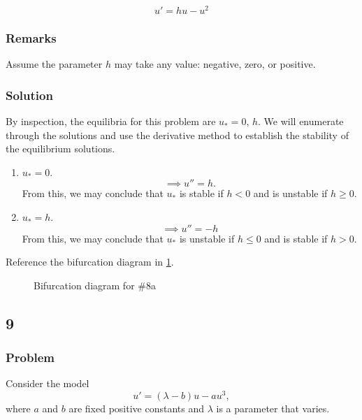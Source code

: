 \documentclass[12pt]{article}
\begin{document}
\begin{equation}
  \label{eq:8a-problem}
  u'=hu-u^2
\end{equation}

\subsubsection*{Remarks}
Assume the parameter $h$ may take any value: negative, zero, or positive.

\subsubsection*{Solution}
By inspection, the equilibria for this problem are $u_*=0,\,h$. We will
enumerate through the solutions and use the derivative method to establish the
stability of the equilibrium solutions.
\begin{enumerate}
\item $u_*=0$.
  $$\implies u''=h.$$ From this, we may conclude that $u_*$ is stable if $h<0$
  and is unstable if $h\ge0$.
\item $u_*=h$.
  $$\implies u''=-h$$ From this, we may conclude that $u_*$ is unstable if $h\le0$
  and is stable if $h>0$.
\end{enumerate}
Reference the bifurcation diagram in \cref{fig:8-bifurcation-diagram}.

\begin{figure}
  \centering
  \caption{Bifurcation diagram for \#8a}
  \label{fig:8-bifurcation-diagram}
\end{figure}

\subsection{9}
\subsubsection*{Problem}
Consider the model
\begin{equation*}
  u'=(\lambda - b) u-au^3,
\end{equation*}
where $a$ and $b$ are fixed positive constants and $\lambda$ is a parameter that
varies.
\end{document}
